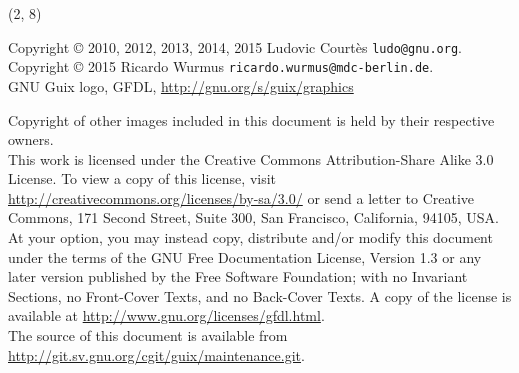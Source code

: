 \documentclass{beamer}
\begin{document}
\begin{frame}{}

  \begin{textblock}{12}(2, 8)
    \tiny{
      Copyright \copyright{} 2010, 2012, 2013, 2014, 2015 Ludovic Courtès \texttt{ludo@gnu.org}.\\
      Copyright \copyright{} 2015 Ricardo Wurmus \texttt{ricardo.wurmus@mdc-berlin.de}.
      \\[3.0mm]
      GNU Guix logo, GFDL, \url{http://gnu.org/s/guix/graphics}

      Copyright of other images included in this document is held by
      their respective owners.
      \\[3.0mm]
      This work is licensed under the \alert{Creative Commons
        Attribution-Share Alike 3.0} License.  To view a copy of this
      license, visit
      \url{http://creativecommons.org/licenses/by-sa/3.0/} or send a
      letter to Creative Commons, 171 Second Street, Suite 300, San
      Francisco, California, 94105, USA.
      \\[2.0mm]
      At your option, you may instead copy, distribute and/or modify
      this document under the terms of the \alert{GNU Free Documentation
        License, Version 1.3 or any later version} published by the Free
      Software Foundation; with no Invariant Sections, no Front-Cover
      Texts, and no Back-Cover Texts.  A copy of the license is
      available at \url{http://www.gnu.org/licenses/gfdl.html}.
      \\[2.0mm]
      The source of this document is available from
      \url{http://git.sv.gnu.org/cgit/guix/maintenance.git}.
    }
  \end{textblock}
\end{frame}
\end{document}

